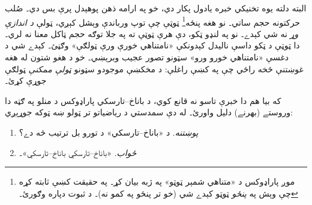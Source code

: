 \documentclass[../../../include/open-logic-section]{subfiles}
\begin{document}
البته دلته يوه تخنيکي خبره يادول پکار دي، خو په ارامه
ذهن پوهېدل پرې بس دي۔ صُلب حرکتونه حجم ساتي۔ نو هغه
پنځه\footnote{موږ پاراډوکس د «متناهي شمېر ټوټو» په ژبه بيان کړ۔
په حقيقت کښې \citet{Robinson1947} ثابته کړه چې وېش په
\emph{پنځو} ټوټو کېدے شي (خو تر پنځو په کمو نه)۔ د ثبوت
دپاره \citet[pp.~66--7]{Wagon2016} وګورئ۔} ټوټې چې توپ
ورباندې وېشل کېږي، ټولې \emph{د اندازې وړ} نه شي کېدے۔
نو په لنډو ټکو، دې هرې ټوټې ته په جلا توګه حجم ټاکل
معنا نه لري۔ دا ټوټې د ټکو داسې ناليدل کېدونکې «نامتناهي
خورې ورې ټولګې» وګڼئ۔ کېدے شي د دغسې «نامتناهي
خورو ورو» سټونو تصور عجيب وبرېښي۔ خو د هغو شتون له
هغه غوښتنې څخه راځي چې په \stagesacc{} کښې راغلې: د
مخکښې موجودو سټونو \emph{ټولې ممکنې} ټولګې جوړې کړئ۔

که بيا هم دا خبرې تاسو نه قانع کوي، د باناخ--تارسکي
پاراډوکس د منلو په ګټه دا وروستے (بهرنے) دليل واورئ۔ له دې
سمدستي د رياضياتو تر ټولو ښه ټوکه جوړېږي:
\begin{enumerate}
	\item[] \emph{پوښتنه}. د «باناخ--تارسکي» د تورو بل ترتيب څه دے؟
	\item[] \emph{ځواب}. «باناخ--تارسکي باناخ--تارسکي»۔
\end{enumerate}
\end{document}
